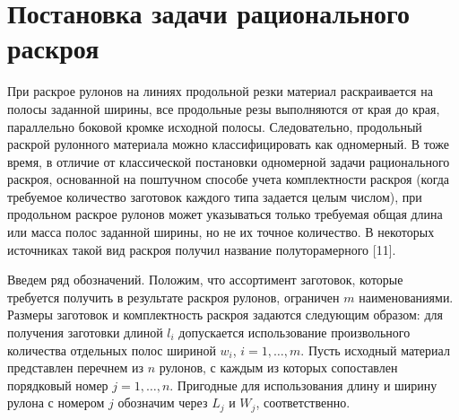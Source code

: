 \documentclass[12pt]{article}
\begin{document}
\section{Постановка задачи рационального раскроя}

При раскрое рулонов на линиях продольной резки материал раскраивается на полосы 
заданной ширины, все продольные резы выполняются от края до края, параллельно 
боковой кромке исходной полосы. Следовательно, продольный раскрой рулонного 
материала можно классифицировать как одномерный. В тоже время, в отличие от 
классической постановки одномерной задачи рационального раскроя, основанной на 
поштучном способе учета комплектности раскроя (когда требуемое количество 
заготовок каждого типа задается целым числом), при продольном раскрое рулонов 
может указываться только требуемая общая длина или масса полос заданной ширины, 
но не их точное количество. В некоторых источниках такой вид раскроя получил 
название полуторамерного [11].

Введем ряд обозначений. Положим, что ассортимент заготовок, которые требуется 
получить в результате раскроя рулонов, ограничен $m$ наименованиями. Размеры 
заготовок и комплектность раскроя задаются следующим образом: для получения 
заготовки длиной $l_i$ допускается использование произвольного количества 
отдельных полос шириной $w_i$, $i=1,\ldots,m$. Пусть исходный материал 
представлен перечнем из $n$ рулонов, с каждым из которых сопоставлен порядковый 
номер $j=1,\ldots,n$. Пригодные для использования длину и ширину рулона с 
номером $j$ обозначим через $L_j$ и $W_j$, соответственно.
\end{document}
